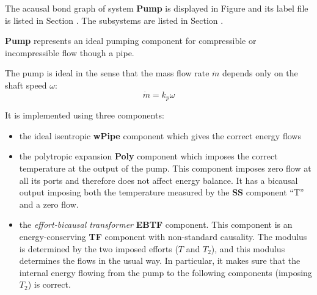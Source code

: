 

   The acausal bond graph of system \textbf{Pump} is
   displayed in Figure  and its label
   file is listed in Section .
   The subsystems are listed in Section .

\textbf{Pump} represents an ideal pumping component for compressible
or incompressible flow though a pipe. 

The pump is ideal in the sense that the mass flow rate $\dot m$
depends only on the shaft speed $\omega$:
\begin{equation}
  \dot m = k_p \omega
\end{equation}

It is implemented using three components:
\begin{itemize}
\item the ideal isentropic \textbf{wPipe} component which gives the
  correct energy flows
\item the polytropic expansion \textbf{Poly} component which imposes
  the correct temperature at the output of the pump. This component
  imposes zero flow at all its ports and therefore does not affect
  energy balance. It has a bicausal output imposing both the
  temperature measured by the \textbf{SS} component ``T'' and a zero
  flow.
\item the \emph{effort-bicausal transformer} \textbf{EBTF}
  component. This component is an energy-conserving \textbf{TF}
  component with non-standard causality. The modulus is determined by
  the two imposed efforts ($T$ and $T_2$), and this modulus determines
  the flows in the usual way. In particular, it makes sure that the
  internal energy flowing from the pump to the following components
  (imposing $T_2$) is correct.
\end{itemize}
